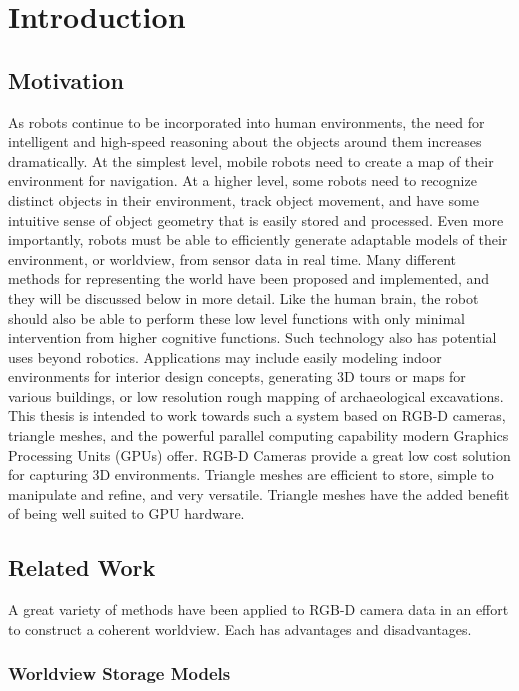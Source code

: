 \chapter{Introduction} %
\section{Motivation}
As robots continue to be incorporated into human environments, the need for intelligent and high-speed reasoning about the objects around them increases dramatically. At the simplest level, mobile robots need to create a map of their environment for navigation. At a higher level, some robots need to recognize distinct objects in their environment, track object movement, and have some intuitive sense of object geometry that is easily stored and processed. Even more importantly, robots must be able to efficiently generate adaptable models of their environment, or worldview, from sensor data in real time. Many different methods for representing the world have been proposed and implemented, and they will be discussed below in more detail. Like the human brain, the robot should also be able to perform these low level functions with only minimal intervention from higher cognitive functions. Such technology also has potential uses beyond robotics. Applications may include easily modeling indoor environments for interior design concepts, generating 3D tours or maps for various buildings, or low resolution rough mapping of archaeological excavations.\\

This thesis is intended to work towards such a system based on RGB-D cameras, triangle meshes, and the powerful parallel computing capability modern Graphics Processing Units (GPUs) offer. RGB-D Cameras provide a great low cost solution for capturing 3D environments. Triangle meshes are efficient to store, simple to manipulate and refine, and very versatile. Triangle meshes have the added benefit of being well suited to GPU hardware.
\section{Related Work} %
A great variety of methods have been applied to RGB-D camera data in an effort to construct a coherent worldview. Each has advantages and disadvantages.
\subsection{Worldview Storage Models}
